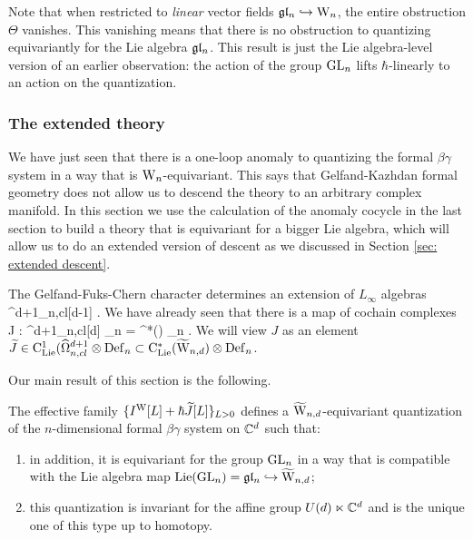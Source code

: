 \documentclass[10pt]{amsart}
\begin{document}
\begin{rmk} 
Note that when restricted to {\em linear} vector fields $\gl_n \hookrightarrow \Vect$, 
the entire obstruction $\Theta$ vanishes. 
This vanishing means that there is no obstruction to quantizing equivariantly for the Lie algebra $\gl_n$. 
This result is just the Lie algebra-level version of an earlier observation: 
the action of the group $\GL_n$ lifts $\hbar$-linearly to an action on the quantization.
\end{rmk}

\subsubsection{The extended theory}

We have just seen that there is a one-loop anomaly to quantizing the formal $\beta\gamma$ system in a way that is $\Vect$-equivariant. 
This says that Gelfand-Kazhdan formal geometry does not allow us to descend the theory to an arbitrary complex manifold. 
In this section we use the calculation of the anomaly cocycle in the last section to build a theory that is equivariant for a bigger Lie algebra, which will allow us to do an extended version of descent as we discussed in Section \ref{sec: extended descent}. 

The Gelfand-Fuks-Chern character determines an extension of $L_\infty$ algebras
 \to \hOmega^{d+1}_{n,cl}[d-1] \to \TVectd {} \Vect {} .
\een
We have already seen that there is a map of cochain complexes
\ben
J : \hOmega^{d+1}_{n,cl}[d] \to \Def_{n} = \clie^*(\Vect) \tensor \Def_n .
\een
We will view $J$ as an element $\Tilde{J} \in \clie^1(\hOmega^{d+1}_{n,cl} \tensor \Def_n \subset \clie^*(\TVectd) \tensor \Def_n$.

Our main result of this section is the following. 

\begin{thm}\label{thm: extended quantization}
The effective family $\{I^{\rm W}[L] + \hbar \Tilde{J} [L]\}_{L>0}$ defines a $\TVectd$-equivariant quantization of the $n$-dimensional formal $\beta\gamma$ system on $\CC^d$ such that:
\begin{enumerate}
\item in addition, it is equivariant for the group $\GL_n$ in a way that is compatible with the Lie algebra map ${\rm Lie}(\GL_n) = \gl_n \hookrightarrow \TVectd$;
\item this quantization is invariant for the affine group $U(d) \ltimes \CC^d$ and is the unique one of this type up to homotopy.
\end{enumerate}
\end{thm}
\end{document}
